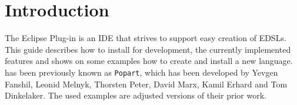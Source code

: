 
\section{Introduction}
  The \tiger Eclipse Plug-in is an IDE that strives to support easy creation of EDSLs. This guide describes how to install  \tiger for development, the currently implemented features and shows on some examples how to create and install a new language.
  \tiger has been previously known as \texttt{Popart}, which has been developed by Yevgen Fanshil, Leonid Melnyk, Thorsten Peter, David Marx, Kamil Erhard and Tom Dinkelaker. The used examples are adjusted versions of their prior work.  